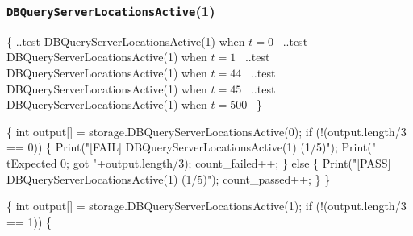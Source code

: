 \documentclass{article}
\def\nwendcode{\endtrivlist \endgroup}
\let\nwdocspar=\par
\begin{document}
\subsubsection{{\tt{}DBQueryServerLocationsActive}(1)}
\nwenddocs{}\endmoddef{}
\{
  \LA{}..test \code{}DBQueryServerLocationsActive\edoc{}(1) when $t=0$~{\nwtagstyle{}}\RA{}
  \LA{}..test \code{}DBQueryServerLocationsActive\edoc{}(1) when $t=1$~{\nwtagstyle{}}\RA{}
  \LA{}..test \code{}DBQueryServerLocationsActive\edoc{}(1) when $t=44$~{\nwtagstyle{}}\RA{}
  \LA{}..test \code{}DBQueryServerLocationsActive\edoc{}(1) when $t=45$~{\nwtagstyle{}}\RA{}
  \LA{}..test \code{}DBQueryServerLocationsActive\edoc{}(1) when $t=500$~{\nwtagstyle{}}\RA{}
\}
\nwendcode{}\nwdocspar
\nwenddocs{}\endmoddef{}
\{
  int output[] = storage.DBQueryServerLocationsActive(0);
  if (!(output.length/3 == 0)) \{
    Print("[FAIL] DBQueryServerLocationsActive(1) (1/5)");
    Print("\\tExpected 0; got "+output.length/3);
    count_failed++;
  \} else \{
    Print("[PASS] DBQueryServerLocationsActive(1) (1/5)");
    count_passed++;
  \}
\}
\nwendcode{}\nwdocspar
\nwenddocs{}\endmoddef{}
\{
  int output[] = storage.DBQueryServerLocationsActive(1);
  if (!(output.length/3 == 1)) \{
\end{document}
